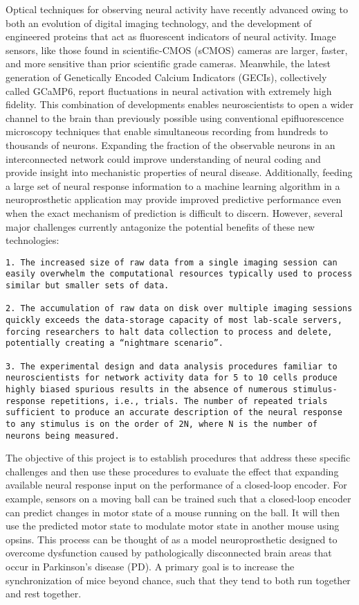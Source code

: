 \documentclass[
  12pt,
  lettersizepaper,
]{book}
\begin{document}
Optical techniques for observing neural activity have recently advanced
owing to both an evolution of digital imaging technology, and the
development of engineered proteins that act as fluorescent indicators of
neural activity. Image sensors, like those found in scientific-CMOS
(sCMOS) cameras are larger, faster, and more sensitive than prior
scientific grade cameras. Meanwhile, the latest generation of
Genetically Encoded Calcium Indicators (GECIs), collectively called
GCaMP6, report fluctuations in neural activation with extremely high
fidelity. This combination of developments enables neuroscientists to
open a wider channel to the brain than previously possible using
conventional epifluorescence microscopy techniques that enable
simultaneous recording from hundreds to thousands of neurons. Expanding
the fraction of the observable neurons in an interconnected network
could improve understanding of neural coding and provide insight into
mechanistic properties of neural disease. Additionally, feeding a large
set of neural response information to a machine learning algorithm in a
neuroprosthetic application may provide improved predictive performance
even when the exact mechanism of prediction is difficult to discern.
However, several major challenges currently antagonize the potential
benefits of these new technologies:

\begin{verbatim}
1. The increased size of raw data from a single imaging session can easily overwhelm the computational resources typically used to process similar but smaller sets of data.

2. The accumulation of raw data on disk over multiple imaging sessions quickly exceeds the data-storage capacity of most lab-scale servers, forcing researchers to halt data collection to process and delete, potentially creating a “nightmare scenario”.

3. The experimental design and data analysis procedures familiar to neuroscientists for network activity data for 5 to 10 cells produce highly biased spurious results in the absence of numerous stimulus-response repetitions, i.e., trials. The number of repeated trials sufficient to produce an accurate description of the neural response to any stimulus is on the order of 2N, where N is the number of neurons being measured.
\end{verbatim}

The objective of this project is to establish procedures that address
these specific challenges and then use these procedures to evaluate the
effect that expanding available neural response input on the performance
of a closed-loop encoder. For example, sensors on a moving ball can be
trained such that a closed-loop encoder can predict changes in motor
state of a mouse running on the ball. It will then use the predicted
motor state to modulate motor state in another mouse using opsins. This
process can be thought of as a model neuroprosthetic designed to
overcome dysfunction caused by pathologically disconnected brain areas
that occur in Parkinson's disease (PD). A primary goal is to increase
the synchronization of mice beyond chance, such that they tend to both
run together and rest together.
\end{document}
